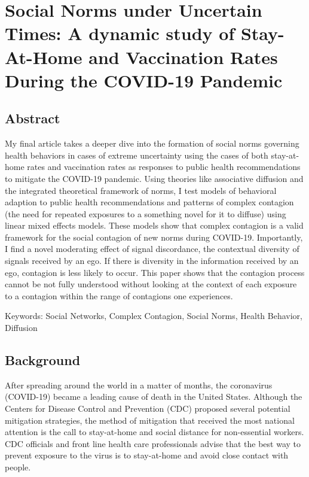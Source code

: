 \hypertarget{paper-3}{%
\chapter{Social Norms under Uncertain Times: A dynamic study of Stay-At-Home and Vaccination Rates During the COVID-19 Pandemic}\label{paper-3}}

\hypertarget{abstract-1}{%
\section{Abstract}\label{abstract-1}}

My final article takes a deeper dive into the formation of social norms
governing health behaviors in cases of extreme uncertainty using the cases of
both stay-at-home rates and vaccination rates as responses to public health
recommendations to mitigate the COVID-19 pandemic. Using theories like
associative diffusion and the integrated theoretical framework of norms, I test
models of behavioral adaption to public health recommendations and patterns of
complex contagion (the need for repeated exposures to a something novel for it
to diffuse) using linear mixed effects models. These models show that complex
contagion is a valid framework for the social contagion of new norms during
COVID-19. Importantly, I find a novel moderating effect of signal discordance,
the contextual diversity of signals received by an ego. If there is diversity in
the information received by an ego, contagion is less likely to occur. This
paper shows that the contagion process cannot be not fully understood without
looking at the context of each exposure to a contagion within the range of
contagions one experiences.

Keywords: Social Networks, Complex Contagion, Social Norms, Health Behavior, Diffusion

\hypertarget{background}{\section{Background}\label{background}}

After spreading around the world in a matter of months, the coronavirus
(COVID-19) became a leading cause of death in the United States. Although the
Centers for Disease Control and Prevention (CDC)
\citeyearpar{centersfordiseasecontrolandpreventionHowProtectYourself2020}
proposed several potential mitigation strategies, the method of mitigation that
received the most national attention is the call to stay-at-home and social
distance for non-essential workers. CDC officials and front line health care
professionals advise that the best way to prevent exposure to the virus is to
stay-at-home and avoid close contact with people.

